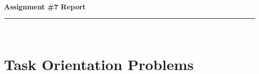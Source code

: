 \documentclass{article}
\newcommand{\HRule}{\rule{\linewidth}{0.5mm}} %
\begin{document}
 \\


\vspace{0.25in}

\begin{center}
	{ \huge \bfseries Assignment \#7 Report}\\[0.4cm] %
	\HRule \\[1.0cm]
\end{center}



%
%


\section{Task Orientation Problems}
\end{document}
